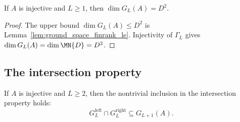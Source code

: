 \begin{theorem}\label{thm:ground_space_finrank_eq}
    \leanok
    If $A$ is injective and $L \ge 1$, then $\dim G_L(A) = D^2$.
\end{theorem}

\begin{proof}
    \leanok
    The upper bound $\dim G_L(A) \le D^2$ is Lemma~\ref{lem:ground_space_finrank_le}.
    Injectivity of $\Gamma_L$ gives $\dim G_L(A) = \dim \MN{D} = D^2$.
\end{proof}

\subsection{The intersection property}

\begin{theorem}\label{thm:ground_space_intersection}
    \leanok
    If $A$ is injective and $L \ge 2$, then the nontrivial inclusion in the
    intersection property holds:
    \[
        G_L^{\mathrm{left}}\cap G_L^{\mathrm{right}}
        \subseteq
        G_{L+1}(A).
    \]
\end{theorem}

